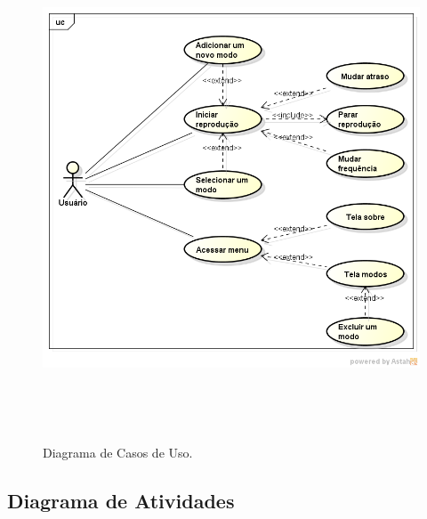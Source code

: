 \begin{figure}[H]
	\centering
	\caption[Diagrama de Casos de Uso]{Diagrama de Casos de Uso. \label{fig:diagramadecasosdeuso}}
	\includegraphics[height=15cm]{./Figuras/usecase_diagram.png}%
\end{figure}

\subsection{Diagrama de Atividades}

